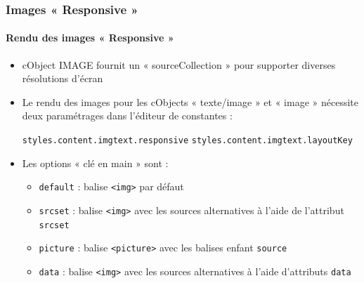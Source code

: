 \begin{frame}[fragile]
	\frametitle{Images « Responsive »}
	\framesubtitle{Rendu des images « Responsive »}

	\begin{itemize}
		\item cObject IMAGE fournit un « sourceCollection » pour supporter diverses résolutions d'écran
		\item Le rendu des images pour les cObjects « texte/image » et « image » nécessite deux paramétrages dans l'éditeur de constantes :

			\texttt{styles.content.imgtext.responsive}\newline
			\texttt{styles.content.imgtext.layoutKey}

		\item Les options « clé en main » sont :

			\begin{itemize}
				\item \texttt{default} :	\tabto{2cm} balise \texttt{<img>} par défaut
				\item \texttt{srcset} :	\tabto{2cm} balise \texttt{<img>} avec les sources alternatives à l'aide de l'attribut \texttt{srcset}
				\item \texttt{picture} :	\tabto{2cm} balise \texttt{<picture>} avec les balises enfant \texttt{source}
				\item \texttt{data} :	\tabto{2cm} balise \texttt{<img>} avec les sources alternatives à l'aide d'attributs \texttt{data}
			\end{itemize}

	\end{itemize}

\end{frame}


